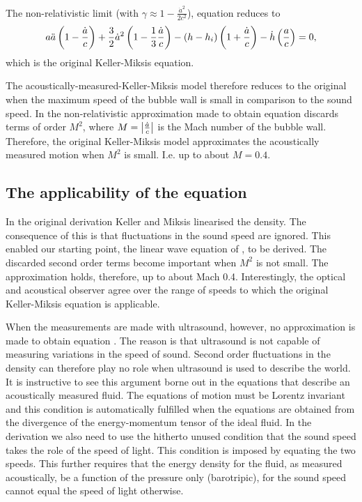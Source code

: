  The  non-relativistic limit (with $\gamma \approx 1 - \frac{{\dot a}^2}{2c^2}$), equation  reduces to
\begin{align}
  a \ddot a\left( 1 - \frac{\dot a}{c} \right)+ \frac{3}{2} {\dot a}^2\left( 1- \frac{1}{3}\frac{\dot a }{c} \right)
    - \left( h - h_i \right)\left( 1 + \frac{\dot a}{c} \right)
  -  \dot h \left( \frac{a}{c} \right)
= 0, \label{eqn:KM}
\end{align}
which is the original Keller-Miksis equation\cite{Hoff2001}.

The acoustically-measured-Keller-Miksis model therefore reduces to the original when the maximum speed of the bubble wall is small in comparison to the sound speed.
In the non-relativistic approximation made to obtain equation  discards terms of order $M^2$, 
where  $M = \left| \frac{\dot a}{c} \right|$ is the Mach number of the bubble wall.
Therefore, the original Keller-Miksis model approximates the acoustically measured motion when $M^2$ is small.
I.e. %
up to about $M=0.4$.


\subsection{The applicability of the equation}
In the original derivation Keller and Miksis linearised the density. 
The consequence of this is that fluctuations in the sound speed are ignored.
This enabled our starting point, the linear wave equation of  , to be derived.
The discarded second order terms become important when $M^2$ is not small.
The approximation holds, therefore, up to about Mach 0.4.
Interestingly,  the optical and acoustical observer
agree over the range of speeds to which the original Keller-Miksis equation is applicable.

When the measurements are made with ultrasound,
however, 
no approximation is made to obtain equation .
The reason is that  ultrasound is not capable of  measuring variations in the speed of sound.
Second order fluctuations in the density  can therefore play no role when ultrasound is used to describe the world.
It is instructive to see this argument borne out in the equations that describe an acoustically measured fluid.
The equations of motion must  be Lorentz invariant and this condition  is automatically fulfilled  when  the equations 
are obtained from the divergence of the energy-momentum tensor of the ideal fluid.
In the derivation we also need to use the hitherto unused  condition
that the sound speed takes the role  of the speed of light.
This condition is imposed by equating the two speeds.
This further requires that the energy density for the fluid, as measured acoustically, be a function of the pressure only (barotripic),
for the sound speed cannot equal the speed of light otherwise\cite{Taub1978}.


